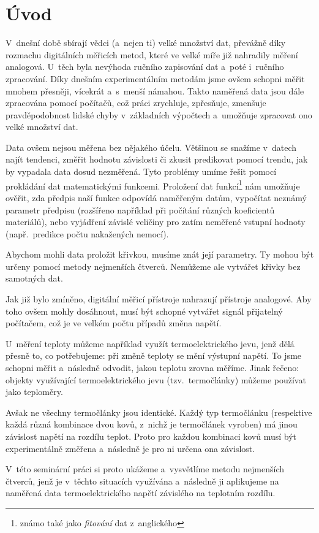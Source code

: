 \section{Úvod}
V~dnešní době sbírají vědci (a~nejen ti) velké množství dat, převážně díky
rozmachu digitálních měřicích metod, které ve velké míře již nahradily měření
analogová. U~těch byla nevýhoda ručního zapisování dat a~poté i~ručního
zpracování. Díky dnešním experimentálním metodám jsme ovšem schopni měřit
mnohem přesněji, vícekrát a~s~menší námahou. Takto naměřená data jsou dále
zpracována pomocí počítačů, což práci zrychluje, zpřesňuje, zmenšuje
pravděpodobnost lidské chyby v~základních výpočtech a~umožňuje zpracovat ono
velké množství dat.

Data ovšem nejsou měřena bez nějakého účelu. Většinou se snažíme v~datech najít
tendenci, změřit hodnotu závislosti či zkusit predikovat pomocí trendu,
jak by vypadala data dosud nezměřená. Tyto problémy umíme řešit pomocí
prokládání dat matematickými funkcemi. Proložení dat funkcí\footnote{známo také
jako \emph{fitování} dat z~anglického } nám umožňuje ověřit, zda
předpis naší funkce odpovídá naměřeným datům, vypočítat neznámý parametr
předpisu (rozšířeno například při počítání různých koeficientů materiálů), nebo
vyjádření závislé veličiny pro zatím neměřené vstupní hodnoty (např.~predikce
počtu nakažených nemocí).

Abychom mohli data proložit křivkou, musíme znát její parametry. Ty mohou být
určeny pomocí metody nejmenších čtverců. Nemůžeme ale vytvářet křivky bez
samotných dat.

Jak již bylo zmíněno, digitální měřicí přístroje nahrazují přístroje analogové.
Aby toho ovšem mohly dosáhnout, musí být schopné vytvářet signál přijatelný
počítačem, což je ve velkém počtu případů změna napětí. 

U~měření teploty můžeme například využít termoelektrického jevu, jenž dělá
přesně to, co potřebujeme: při změně teploty se mění výstupní napětí. To jsme
schopni měřit a~následně odvodit, jakou teplotu zrovna měříme. Jinak řečeno:
objekty využívající termoelektrického jevu (tzv.~termočlánky) můžeme používat
jako teploměry.

Avšak ne všechny termočlánky jsou identické. Každý typ termočlánku (respektive
každá různá kombinace dvou kovů, z~nichž je termočlánek vyroben) má jinou
závislost napětí na rozdílu teplot. Proto pro každou kombinaci kovů musí být
experimentálně změřena a~následně je pro ni určena ona závislost.

V~této seminární práci si proto ukážeme a~vysvětlíme metodu nejmenších čtverců,
jenž je v~těchto situacích využívána a~následně ji aplikujeme na naměřená data
termoelektrického napětí závislého na teplotním rozdílu.
